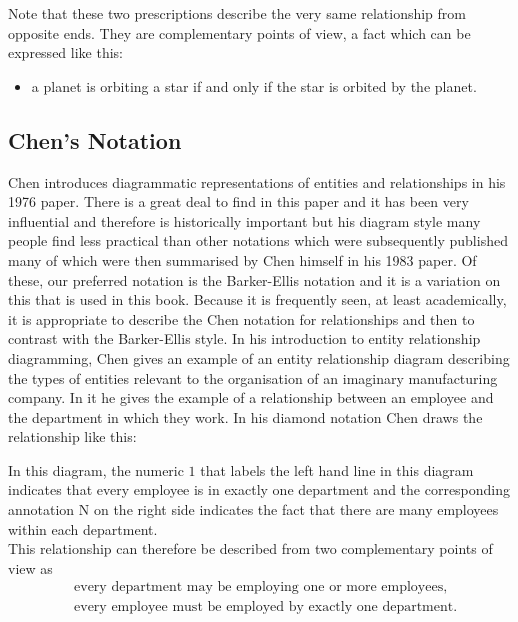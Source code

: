 Note that these two prescriptions describe the very same relationship from opposite ends. 
They are complementary points of view, a fact which  can be expressed like this:
\begin{itemize}
\item a planet is orbiting a star if and only if the star is orbited by the planet.
\end{itemize}
\subsection{Chen's Notation}
\mynote
Chen introduces diagrammatic representations of entities and relationships in his 
1976 paper. There is a great deal to find in this paper and it has been very influential and therefore is historically important but his diagram style many people find less practical than other notations which were subsequently published many of which were then summarised by Chen himself in his 1983 paper. 
Of these, our preferred notation is the Barker-Ellis notation and it is a variation on this that is used in this book. 
Because it is frequently seen, at least academically, it is appropriate
to describe the Chen notation for relationships and then to contrast with the Barker-Ellis style.
\mynote
In his introduction to entity relationship diagramming, Chen gives an example of an entity relationship diagram describing the types of entities relevant to the organisation of an imaginary manufacturing company.
In it he gives the example of a relationship between an employee and the department in which they work. In his diamond notation Chen draws the relationship like this:
\begin{center}
\scalebox{0.9}{}
\end{center}

\noindent In this diagram, the numeric $1$ that labels the left hand line in this diagram indicates that every employee is in exactly one department and the corresponding annotation N on the right side indicates the fact that there are many employees within each department. \\

\noindent This relationship can therefore be described from  two complementary points of view as
\begin{align}
\label{employingText}&\mbox{every department may be employing one or more employees,} \\
\label{employedByText}&\mbox{every employee must be employed by exactly one department.}
\end{align}


